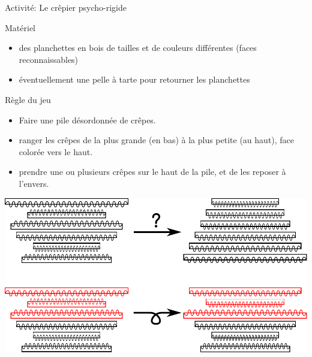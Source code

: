 \begin{frame}{Activité: Le crêpier psycho-rigide}

  \begin{block}{Matériel}
    \begin{itemize}
    \item des planchettes en bois de tailles et de couleurs différentes (faces reconnaissables)
    \item éventuellement une pelle à tarte pour retourner les planchettes
    \end{itemize}
  \end{block}

  \begin{block}{Règle du jeu}
    \begin{itemize}
      \item {} Faire une pile désordonnée de crêpes.
      \item {} ranger les crêpes de la plus grande (en bas) à la plus petite (au haut), face colorée vers le haut.
      \item {} prendre une ou plusieurs crêpes sur le haut de la pile, et de les reposer à l'envers.
    \end{itemize}
  \end{block}

  \bigskip \bigskip \bigskip

  \begin{center}
    \includegraphics[width=0.8\linewidth]{img/crepier.pdf}
  \end{center}

\end{frame}


